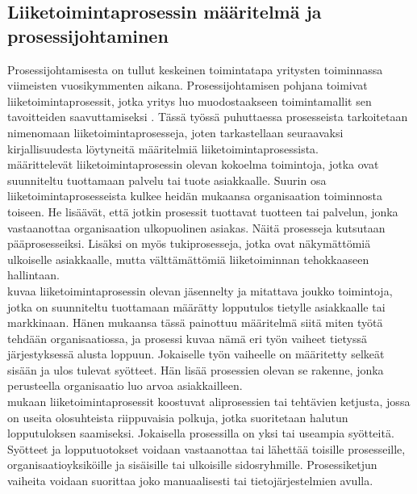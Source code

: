 \documentclass[finnish,12pt,a4paper,pdftex]{article}
\begin{document}
\subsection{Liiketoimintaprosessin määritelmä ja prosessijohtaminen}

Prosessijohtamisesta on tullut keskeinen toimintatapa yritysten toiminnassa viimeisten vuosikymmenten aikana. Prosessijohtamisen pohjana toimivat liiketoimintaprosessit, jotka yritys luo muodostaakseen toimintamallit sen tavoitteiden saavuttamiseksi \citep{ohjelmistotuotanto}. Tässä työssä puhuttaessa prosesseista tarkoitetaan nimenomaan liiketoimintaprosesseja, joten tarkastellaan seuraavaksi kirjallisuudesta löytyneitä määritelmiä liiketoimintaprosessista.\\

\cite{rumbra} määrittelevät liiketoimintaprosessin olevan kokoelma toimintoja, jotka ovat suunniteltu tuottamaan palvelu tai tuote asiakkaalle. Suurin osa liiketoimintaprosesseista kulkee heidän mukaansa organisaation toiminnosta toiseen. He lisäävät, että jotkin prosessit tuottavat tuotteen tai palvelun, jonka vastaanottaa organisaation ulkopuolinen asiakas. Näitä prosesseja kutsutaan pääprosesseiksi. Lisäksi on myös tukiprosesseja, jotka ovat näkymättömiä ulkoiselle asiakkaalle, mutta välttämättömiä liiketoiminnan tehokkaaseen hallintaan.\\

\noindent \cite{davenport} kuvaa liiketoimintaprosessin olevan jäsennelty ja mitattava joukko toimintoja, jotka on suunniteltu tuottamaan määrätty lopputulos tietylle asiakkaalle tai markkinaan. Hänen mukaansa tässä painottuu määritelmä siitä miten työtä tehdään organisaatiossa, ja prosessi kuvaa nämä eri työn vaiheet tietyssä järjestyksessä alusta loppuun. Jokaiselle työn vaiheelle on määritetty selkeät sisään ja ulos tulevat syötteet. Hän lisää prosessien olevan se rakenne, jonka perusteella organisaatio luo arvoa asiakkailleen.\\

\noindent \cite{weske} mukaan liiketoimintaprosessit koostuvat aliprosessien tai tehtävien ketjusta, jossa on useita olosuhteista riippuvaisia polkuja, jotka suoritetaan halutun lopputuloksen saamiseksi. Jokaisella prosessilla on yksi tai useampia syötteitä. Syötteet ja lopputuotokset voidaan vastaanottaa tai lähettää toisille prosesseille, organisaatioyksiköille ja  sisäisille tai ulkoisille sidosryhmille. Prosessiketjun vaiheita voidaan suorittaa joko manuaalisesti tai tietojärjestelmien avulla.\\
\end{document}
